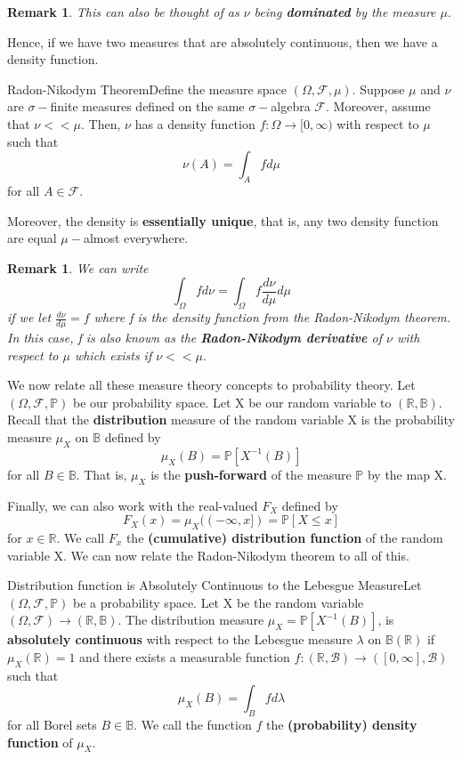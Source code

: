 \documentclass[twoside]{article}
\newtheorem{remark}[theorem]{Remark}
\newcommand{\sigmalgebra}{\mathcal{F}}
\newcommand{\borelsigmaalgebra}{\mathcal{B}}
\newcommand{\prob}{\mathbb{P}}
\begin{document}
\begin{remark}This can also be thought of as $\nu$ being \textbf{dominated} by the measure $\mu.$
\end{remark}

Hence, if we have two measures that are absolutely continuous, then we have a density function.

\begin{theorem_exam}{Radon-Nikodym Theorem}{}Define the measure space $(\Omega, \sigmalgebra, \mu).$ Suppose $\mu$ and $\nu$ are $\sigma-$finite measures defined on the same $\sigma-$algebra $\mathcal{F}.$ Moreover, assume that $\nu << \mu.$ Then, $\nu$ has a density function $f: \Omega \rightarrow [0, \infty)$ with respect to $\mu$ such that 
$$
\nu(A) = \int_{A}fd\mu
$$
for all $A \in \mathcal{F}.$

Moreover, the density is \textbf{essentially unique}, that is, any two density function are equal $\mu-$almost everywhere.
\end{theorem_exam}

\begin{remark}We can write
$$
\int_{\Omega}fd\nu = \int_{\Omega}f\frac{d \nu }{d \mu}d\mu
$$
if we let $\frac{d\nu}{d\mu} = f$ where f is the density function from the Radon-Nikodym theorem. In this case, f is also known as the \textbf{Radon-Nikodym derivative} of $\nu$ with respect to $\mu$ which exists if $\nu << \mu.$
\end{remark}



We now relate all these measure theory concepts to probability theory. Let $(\Omega, \mathcal{F}, \prob)$ be our probability space. Let X be our random variable to $(\mathbb{R}, \mathbb{B})$. Recall that the \textbf{distribution} measure of the random variable X is the probability measure $\mu_X$ on $\mathbb{B}$ defined by 
$$
\mu_X(B) = \prob[X^{-1}(B)]
$$
for all $B \in \mathbb{B}$. That is, $\mu_X$ is the \textbf{push-forward} of the measure $\prob$ by the map X. 

Finally, we can also work with the real-valued $F_X$ defined by 
$$
F_X(x) = \mu_X((-\infty, x]) = \prob[X \leq x]
$$
for $x \in \mathbb{R}$. We call $F_x$ the \textbf{(cumulative) distribution function} of the random variable X. We can now relate the Radon-Nikodym theorem to all of this.


\begin{definition_exam}{Distribution function is Absolutely Continuous to the Lebesgue Measure}{}Let $(\Omega, \mathcal{F}, \prob)$ be a probability space. Let X be the random variable $(\Omega, \mathcal{F}) \rightarrow (\mathbb{R}, \mathbb{B}).$ The distribution measure $\mu_X = \prob[X^{-1}(B)]$, is \textbf{absolutely continuous} with respect to the Lebesgue measure $\lambda$ on $\mathbb{B}(\mathbb{R})$ if $\mu_{X}(\mathbb{R}) = 1$ and there exists a measurable function $f: (\mathbb{R}, \borelsigmaalgebra) \rightarrow ([0, \infty], \borelsigmaalgebra)$ such that 
$$
\mu_X(B) = \int_Bfd\lambda
$$
for all Borel sets $B \in \mathbb{B}.$ We call the function $f$ the \textbf{(probability) density function} of $\mu_X$.
\end{definition_exam}
\end{document}
